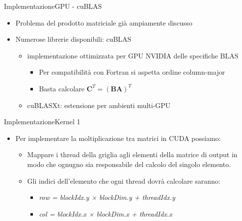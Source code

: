 \documentclass{beamer}
\begin{document}
\begin{frame}{Implementazione}{GPU - cuBLAS}
    \begin{itemize}
        \item Problema del prodotto matriciale già ampiamente discusso
        \item Numerose librerie disponibili: \alert{cuBLAS}
              \begin{itemize}
                  \item implementazione ottimizzata per GPU NVIDIA delle specifiche BLAS
                        \begin{itemize}
                            \item Per compatibilità con Fortran si aspetta ordine column-major
                            \item Basta calcolare $\mathbf{C}^T=(\mathbf{B}\mathbf{A})^T$
                        \end{itemize}
                  \item \alert{cuBLASXt}: estensione per ambienti multi-GPU
              \end{itemize}
    \end{itemize}
\end{frame}

\begin{frame}{Implementazione}{Kernel 1}
    \begin{itemize}
        \item Per implementare la moltiplicazione tra matrici in CUDA possiamo:
            \begin{itemize}
                \item Mappare i thread della griglia agli elementi della matrice di output in modo che ognugno sia responsabile del calcolo del singolo elemento.
                \item Gli indici dell'elemento che ogni thread dovrà calcolare saranno:
                    \begin{itemize}
                        \item \textit{row = blockIdx.y × blockDim.y + threadIdx.y}
                        \item \textit{col = blockIdx.x × blockDim.x + threadIdx.x}
                    \end{itemize}
            \end{itemize}
    \end{itemize}
\end{frame}
\end{document}
